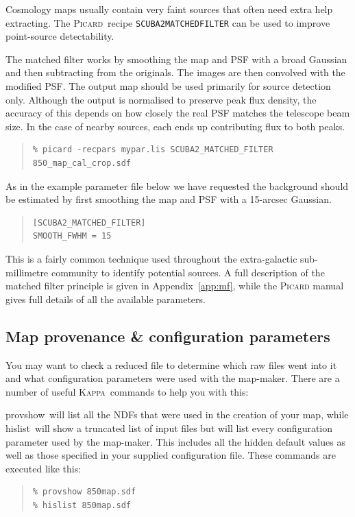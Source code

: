 \documentclass[twoside,11pt]{article}
\newcommand{\htmlref}[2]{#1}
\newcommand{\latexhtml}[2]{#1}
\newcommand{\xref}[3]{#1}
\newcommand{\xlabel}[1]{}
\renewcommand{\_}{\texttt{\symbol{95}}}
\newenvironment{myquote}{\begin{quote}\begin{small}}{\end{small}\end{quote}}
\newcommand{\Kappa}{\xref{\textsc{Kappa}}{sun95}{}}
\newcommand{\picard}{\xref{\textsc{Picard}}{sun265}{}}
\newcommand{\drrecipe}[1]{\texttt{#1}}
\newcommand{\task}[1]{\textsf{#1}}
\newcommand{\hislist}{\xref{\task{hislist}}{sun95}{HISLIST}}
\newcommand{\provshow}{\xref{\task{provshow}}{sun95}{PROVSHOW}}
\newcommand{\cref}[3]{\latexhtml{#1~\ref{#2}}{\htmlref{#3}{#2}}}
\begin{document}
Cosmology maps usually contain very faint sources that often need
extra help extracting. The \picard\ recipe
\xref{\drrecipe{SCUBA2\_MATCHED\_FILTER}}{sun265}{SCUBA2_MATCHED_FILTER}
can be used to improve point-source detectability.

The matched filter works by smoothing the map and PSF with a broad
Gaussian and then subtracting from the originals. The images are then
convolved with the modified PSF. The output map should be used
primarily for source detection only. Although the output is normalised
to preserve peak flux density, the accuracy of this depends on how
closely the real PSF matches the telescope beam size. In the case of
nearby sources, each ends up contributing flux to both peaks.

\begin{myquote}
\begin{verbatim}
% picard -recpars mypar.lis SCUBA2_MATCHED_FILTER 850_map_cal_crop.sdf
\end{verbatim}
\end{myquote}

As in the example parameter file below we have requested the
background should be estimated by first smoothing the map and PSF with
a 15-arcsec Gaussian.
\begin{myquote}
\begin{verbatim}
[SCUBA2_MATCHED_FILTER]
SMOOTH_FWHM = 15
\end{verbatim}
\end{myquote}
This is a fairly common technique used throughout the extra-galactic
sub-millimetre community to identify potential sources. A full
description of the matched filter principle is given in
\cref{Appendix}{app:mf}{SCUBA-2 Matched Filter}, while the \textsc{Picard}
manual gives full details of all the available parameters.


\subsection{\xlabel{provenance}Map provenance \& configuration parameters}
\label{sec:prov}

You may want to check a reduced file to determine which raw files went
into it and what configuration parameters were used with the
map-maker. There are a number of useful \Kappa\ commands to help you
with this:

\provshow\ will list all the NDFs that were used in the creation of
your map, while \hislist\ will show a truncated list of input files
but will list every configuration parameter used by the map-maker.
This includes all the hidden default values as well as those specified
in your supplied configuration file. These commands are executed like
this:
\begin{myquote}
\begin{verbatim}
% provshow 850map.sdf
% hislist 850map.sdf
\end{verbatim}
\end{myquote}
\end{document}
